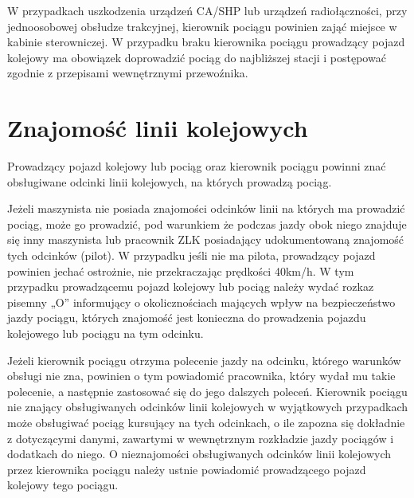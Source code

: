 W przypadkach uszkodzenia urządzeń CA/SHP lub urządzeń radiołączności, przy jednoosobowej obsłudze trakcyjnej, kierownik pociągu powinien zająć miejsce w kabinie sterowniczej. W przypadku braku kierownika pociągu prowadzący pojazd kolejowy ma obowiązek doprowadzić pociąg do najbliższej stacji i postępować zgodnie z przepisami wewnętrznymi przewoźnika. 

\section{Znajomość linii kolejowych}

Prowadzący pojazd kolejowy lub pociąg oraz kierownik pociągu powinni znać obsługiwane odcinki linii kolejowych, na których prowadzą pociąg.

Jeżeli maszynista nie posiada znajomości odcinków linii na których ma prowadzić pociąg, może go prowadzić, pod warunkiem że podczas jazdy obok niego znajduje się inny maszynista lub pracownik ZLK posiadający udokumentowaną znajomość tych
odcinków (pilot). W przypadku jeśli nie ma pilota, prowadzący pojazd powinien jechać ostrożnie, nie przekraczając prędkości 40km/h. W tym przypadku prowadzącemu pojazd kolejowy lub pociąg należy wydać rozkaz pisemny „O” informujący o okolicznościach mających wpływ na bezpieczeństwo jazdy pociągu, których znajomość jest konieczna do prowadzenia pojazdu kolejowego lub pociągu na tym odcinku.

Jeżeli kierownik pociągu otrzyma polecenie jazdy na odcinku, którego warunków obsługi nie zna, powinien o tym powiadomić pracownika, który wydał mu takie polecenie, a następnie zastosować się do jego dalszych poleceń. Kierownik pociągu nie znający obsługiwanych odcinków linii kolejowych w wyjątkowych przypadkach może obsługiwać pociąg kursujący na tych odcinkach, o ile zapozna się dokładnie z dotyczącymi danymi, zawartymi w wewnętrznym rozkładzie jazdy pociągów i dodatkach do niego. O nieznajomości obsługiwanych odcinków linii kolejowych przez kierownika pociągu należy ustnie powiadomić prowadzącego pojazd kolejowy tego pociągu.

